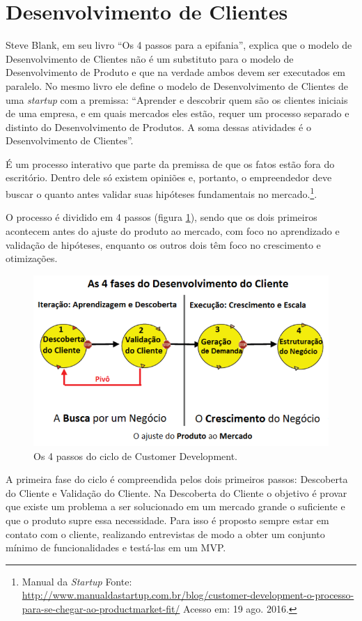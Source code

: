 \section{Desenvolvimento de Clientes}
\par Steve Blank, em seu livro ``Os 4 passos para a epifania'', explica que o modelo de Desenvolvimento de Clientes não é um substituto para o modelo de Desenvolvimento de Produto e que na verdade ambos devem ser executados em paralelo. No mesmo livro ele define o modelo de Desenvolvimento de Clientes de uma \emph{startup} com a premissa: “Aprender e descobrir quem são os clientes iniciais de uma empresa, e em quais mercados eles estão, requer um processo separado e distinto do Desenvolvimento de Produtos. A soma dessas atividades é o Desenvolvimento de Clientes”. \citep{blank:03}
\par É um processo interativo que parte da premissa de que os fatos estão fora do escritório. Dentro dele só existem opiniões e, portanto, o empreendedor deve buscar o quanto antes validar suas hipóteses fundamentais no mercado.\footnote{Manual da \emph{Startup} Fonte: \url{http://www.manualdastartup.com.br/blog/customer-development-o-processo-para-se-chegar-ao-productmarket-fit/} Acesso em: 19 ago. 2016.}.
\par O processo é dividido em 4 passos (figura \ref{fig:customerdevelopment}), sendo que os dois primeiros acontecem antes do ajuste do produto ao mercado, com foco no aprendizado e validação de hipóteses, enquanto os outros dois têm foco no crescimento e otimizações.
\begin{figure}[htb]
\centering
\includegraphics[width=15cm]{figuras/customerdevelopment}
\caption{\label{fig:customerdevelopment}Os 4 passos do ciclo de Customer Development.}
\end{figure}
\par A primeira fase do ciclo é compreendida pelos dois primeiros passos: Descoberta do Cliente e Validação do Cliente. Na Descoberta do Cliente o objetivo é provar que existe um problema a ser solucionado em um mercado grande o suficiente e que o produto supre essa necessidade. Para isso é proposto sempre estar em contato com o cliente, realizando entrevistas de modo a obter um conjunto mínimo de funcionalidades e testá-las em um MVP.
